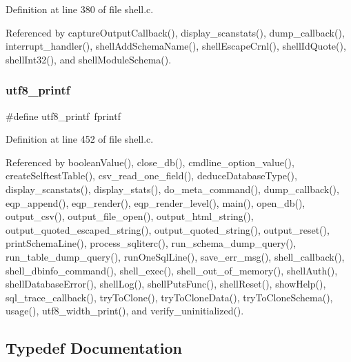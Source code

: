 Definition at line 380 of file shell.\+c.



Referenced by capture\+Output\+Callback(), display\+\_\+scanstats(), dump\+\_\+callback(), interrupt\+\_\+handler(), shell\+Add\+Schema\+Name(), shell\+Escape\+Crnl(), shell\+Id\+Quote(), shell\+Int32(), and shell\+Module\+Schema().

\mbox{\label{shell_8c_aa7bc4ba9077b8add5f607d0d0993a006}} 
\subsubsection{utf8\+\_\+printf}
{\footnotesize\ttfamily \#define utf8\+\_\+printf~fprintf}



Definition at line 452 of file shell.\+c.



Referenced by boolean\+Value(), close\+\_\+db(), cmdline\+\_\+option\+\_\+value(), create\+Selftest\+Table(), csv\+\_\+read\+\_\+one\+\_\+field(), deduce\+Database\+Type(), display\+\_\+scanstats(), display\+\_\+stats(), do\+\_\+meta\+\_\+command(), dump\+\_\+callback(), eqp\+\_\+append(), eqp\+\_\+render(), eqp\+\_\+render\+\_\+level(), main(), open\+\_\+db(), output\+\_\+csv(), output\+\_\+file\+\_\+open(), output\+\_\+html\+\_\+string(), output\+\_\+quoted\+\_\+escaped\+\_\+string(), output\+\_\+quoted\+\_\+string(), output\+\_\+reset(), print\+Schema\+Line(), process\+\_\+sqliterc(), run\+\_\+schema\+\_\+dump\+\_\+query(), run\+\_\+table\+\_\+dump\+\_\+query(), run\+One\+Sql\+Line(), save\+\_\+err\+\_\+msg(), shell\+\_\+callback(), shell\+\_\+dbinfo\+\_\+command(), shell\+\_\+exec(), shell\+\_\+out\+\_\+of\+\_\+memory(), shell\+Auth(), shell\+Database\+Error(), shell\+Log(), shell\+Puts\+Func(), shell\+Reset(), show\+Help(), sql\+\_\+trace\+\_\+callback(), try\+To\+Clone(), try\+To\+Clone\+Data(), try\+To\+Clone\+Schema(), usage(), utf8\+\_\+width\+\_\+print(), and verify\+\_\+uninitialized().



\subsection{Typedef Documentation}
\mbox{\label{shell_8c_a56c51fd9a5a18f256e6ccd05e512bb35}} 
